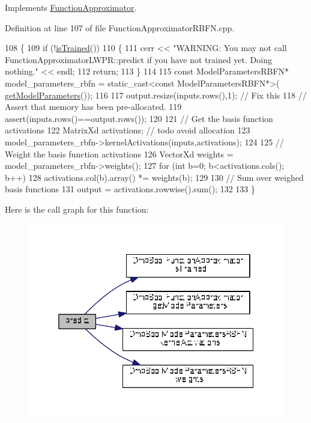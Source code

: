 Implements \hyperlink{classDmpBbo_1_1FunctionApproximator_a0547681a81d4c43ce2601f16047baf7a}{Function\+Approximator}.



Definition at line 107 of file Function\+Approximator\+R\+B\+F\+N.\+cpp.


\begin{DoxyCode}
108 \{
109   \textcolor{keywordflow}{if} (!\hyperlink{classDmpBbo_1_1FunctionApproximator_a178135f623d9b9058870851a53299c6e}{isTrained}())  
110   \{
111     cerr << \textcolor{stringliteral}{"WARNING: You may not call FunctionApproximatorLWPR::predict if you have not trained yet. Doing
       nothing."} << endl;
112     \textcolor{keywordflow}{return};
113   \}
114 
115   \textcolor{keyword}{const} ModelParametersRBFN* model\_parameters\_rbfn = \textcolor{keyword}{static\_cast<}\textcolor{keyword}{const }ModelParametersRBFN*\textcolor{keyword}{>}(
      \hyperlink{classDmpBbo_1_1FunctionApproximator_a0e7e116ed9b159d782fca544dacb4bac}{getModelParameters}());
116   
117   output.resize(inputs.rows(),1); \textcolor{comment}{// Fix this}
118   \textcolor{comment}{// Assert that memory has been pre-allocated.}
119   assert(inputs.rows()==output.rows());
120   
121   \textcolor{comment}{// Get the basis function activations  }
122   MatrixXd activations; \textcolor{comment}{// todo avoid allocation}
123   model\_parameters\_rbfn->kernelActivations(inputs,activations);
124     
125   \textcolor{comment}{// Weight the basis function activations  }
126   VectorXd weights = model\_parameters\_rbfn->weights();
127   \textcolor{keywordflow}{for} (\textcolor{keywordtype}{int} b=0; b<activations.cols(); b++)
128     activations.col(b).array() *= weights(b);
129 
130   \textcolor{comment}{// Sum over weighed basis functions}
131   output = activations.rowwise().sum();
132     
133 \}
\end{DoxyCode}


Here is the call graph for this function\+:
\nopagebreak
\begin{figure}[H]
\begin{center}
\leavevmode
\includegraphics[width=338pt]{classDmpBbo_1_1FunctionApproximatorRBFN_afe8dcfb9cd065dfde38dce1f6e6cd3e6_cgraph}
\end{center}
\end{figure}


